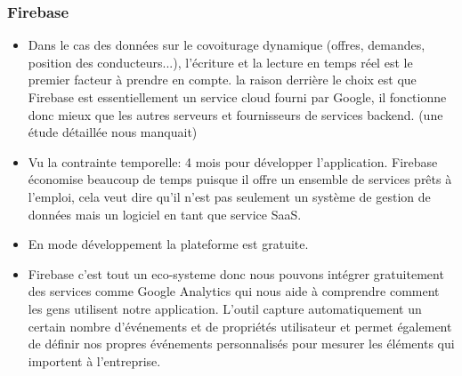 \subsubsection{Firebase} %
\label{ssub:firebase}
\begin{itemize}
	\item Dans le cas des données sur le covoiturage dynamique (offres, demandes, position des conducteurs...), l’écriture et la lecture en temps réel est le premier facteur à prendre en compte. la raison derrière le choix est que Firebase est essentiellement un service cloud fourni par Google, il fonctionne donc mieux que les autres serveurs et fournisseurs de services backend. (une étude détaillée nous manquait)
	\item Vu la contrainte temporelle: 4 mois pour développer l'application. Firebase économise beaucoup de temps puisque il offre un ensemble de services prêts à l'emploi, cela veut dire qu'il n'est pas seulement un système de gestion de données mais un logiciel en tant que service SaaS.
	\item En mode développement la plateforme est gratuite.
	\item Firebase c'est tout un eco-systeme donc nous pouvons intégrer gratuitement des services comme Google Analytics qui nous aide à comprendre comment les gens utilisent notre application. L'outil capture automatiquement un certain nombre d'événements et de propriétés utilisateur et permet également de définir nos propres événements personnalisés pour mesurer les éléments qui importent à l'entreprise. 
\end{itemize}
